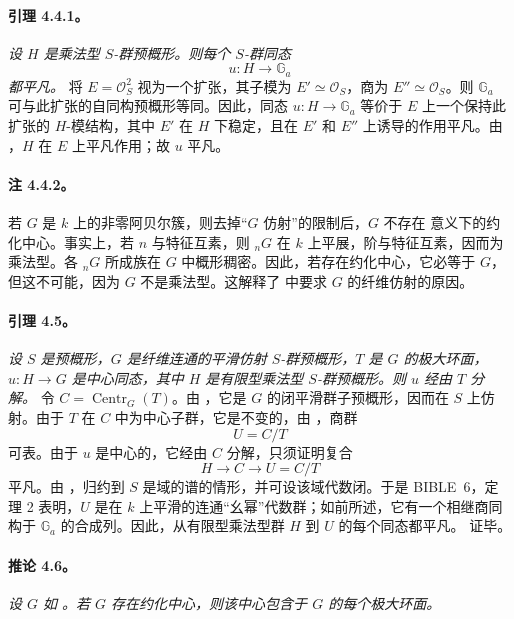 \paragraph{\textbf{引理 4.4.1。}}
\emph{设 \(H\) 是乘法型 \(S\)-群预概形。则每个 \(S\)-群同态
\[
  u:H\longrightarrow\mathbb G_a
\]
都平凡。}
将 \(E=\mathcal O_S^2\) 视为一个扩张，其子模为 \(E'\simeq\mathcal O_S\)，商为 \(E''\simeq\mathcal O_S\)。则 \(\mathbb G_a\) 可与此扩张的自同构预概形等同。因此，同态 \(u:H\to\mathbb G_a\) 等价于 \(E\) 上一个保持此扩张的 \(H\)-模结构，其中 \(E'\) 在 \(H\) 下稳定，且在 \(E'\) 和 \(E''\) 上诱导的作用平凡。由 ，\(H\) 在 \(E\) 上平凡作用；故 \(u\) 平凡。
\paragraph{\textbf{注 4.4.2。}}
若 \(G\) 是 \(k\) 上的非零阿贝尔簇，则去掉“\(G\) 仿射”的限制后，\(G\) 不存在  意义下的约化中心。事实上，若 \(n\) 与特征互素，则 \({}_nG\) 在 \(k\) 上平展，阶与特征互素，因而为乘法型。各 \({}_nG\) 所成族在 \(G\) 中概形稠密。因此，若存在约化中心，它必等于 \(G\)，但这不可能，因为 \(G\) 不是乘法型。这解释了  中要求 \(G\) 的纤维仿射的原因。
\paragraph{\textbf{引理 4.5。}}
\emph{设 \(S\) 是预概形，\(G\) 是纤维连通的平滑仿射 \(S\)-群预概形，\(T\) 是 \(G\) 的极大环面，\(u:H\to G\) 是中心同态，其中 \(H\) 是有限型乘法型 \(S\)-群预概形。则 \(u\) 经由 \(T\) 分解。}
令 \(C=\operatorname{Centr}_G(T)\)。由 ，它是 \(G\) 的闭平滑群子预概形，因而在 \(S\) 上仿射。由于 \(T\) 在 \(C\) 中为中心子群，它是不变的，由 ，商群
\[
  U=C/T
\]
可表。由于 \(u\) 是中心的，它经由 \(C\) 分解，只须证明复合
\[
  H\longrightarrow C\longrightarrow U=C/T
\]
平凡。由 ，归约到 \(S\) 是域的谱的情形，并可设该域代数闭。于是 BIBLE~6，定理 2 表明，\(U\) 是在 \(k\) 上平滑的连通“幺幂”代数群；如前所述，它有一个相继商同构于 \(\mathbb G_a\) 的合成列。因此，从有限型乘法型群 \(H\) 到 \(U\) 的每个同态都平凡。 证毕。
\paragraph{\textbf{推论 4.6。}}
\emph{设 \(G\) 如 。若 \(G\) 存在约化中心，则该中心包含于 \(G\) 的每个极大环面。}
